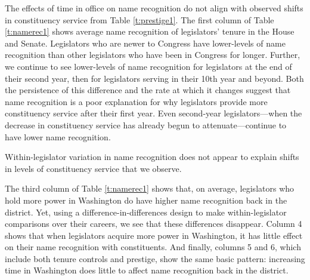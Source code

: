 \documentclass[12pt]{article}
\begin{document}
The effects of time in office on name recognition do not align with observed shifts in constituency service from Table \ref{t:prestige1}.
The first column of Table \ref{t:namerec1} shows average name recognition of legislators' tenure in the House and Senate. Legislators who are newer to Congress have lower-levels of name recognition than other legislators who have been in Congress for longer. Further, we continue to see lower-levels of name recognition for legislators at the end of their second year, then for legislators serving in their 10th year and beyond. Both the persistence of this difference and the rate at which it changes suggest that name recognition is a poor explanation for why legislators provide more constituency service after their first year. Even second-year legislators---when the decrease in constituency service has already begun to attenuate---continue to have lower name recognition.  %

Within-legislator variation in name recognition does not appear to explain shifts in levels of constituency service that we observe. %

The third column of Table \ref{t:namerec1} shows that, on average, legislators who hold more power in Washington do have higher name recognition back in the district. Yet, using a difference-in-differences design to make within-legislator comparisons over their careers, we see that these differences disappear. Column 4 shows that when legislators acquire more power in Washington, it has little effect on their name recognition with constituents. And finally, columns 5 and 6, which include both tenure controls and prestige, show the same basic pattern: increasing time in Washington does little to affect name recognition back in the district.  
\end{document}
